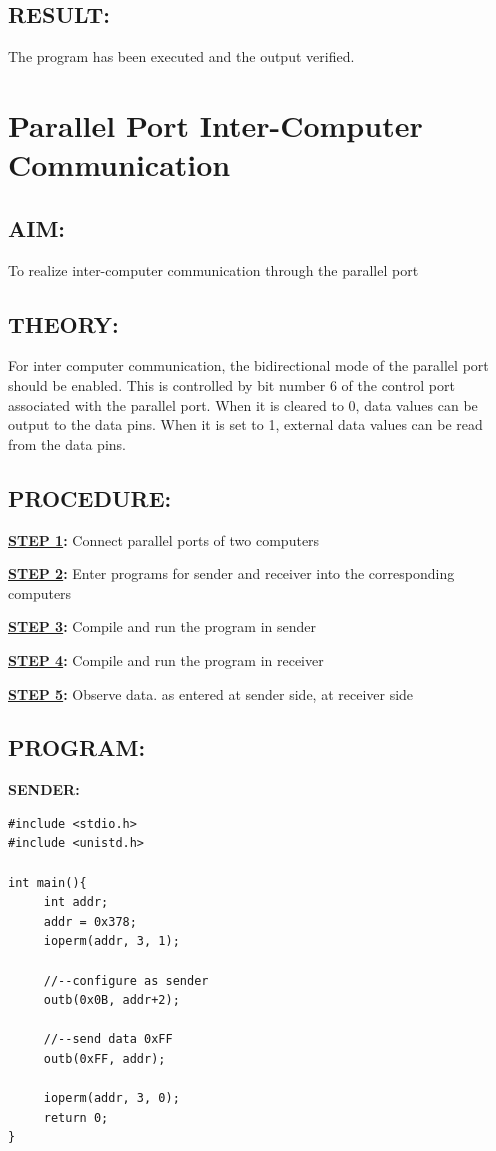 \documentclass[a4paper,28pt]{report}
\begin{document}
\section*{RESULT:}
The program has been executed and the output verified.
%
%
\chapter{Parallel Port Inter-Computer Communication}
%
%
%
%
\section*{AIM:}
To realize inter-computer communication through the parallel port
\section*{THEORY:}
For inter computer communication, the bidirectional mode of the parallel port should be enabled. This is controlled by bit number 6 of the control port associated with the parallel port. When it is cleared to 0, data values can be output to the data pins. When it is set to 1, external data values can be read from the data pins.
\section*{PROCEDURE:}
\textbf{\underline{STEP 1}:} Connect parallel ports of two computers

\textbf{\underline{STEP 2}:} Enter programs for sender and receiver into the corresponding\\\hspace*{55pt}computers

\textbf{\underline{STEP 3}:} Compile and run the program in sender

\textbf{\underline{STEP 4}:} Compile and run the program in receiver

\textbf{\underline{STEP 5}:} Observe data. as entered at sender side, at receiver side

\section*{PROGRAM:}
\textbf{SENDER:}
\begin{lstlisting}
#include <stdio.h>
#include <unistd.h>

int main(){
     int addr;
     addr = 0x378;
     ioperm(addr, 3, 1);
     
     //--configure as sender
     outb(0x0B, addr+2);
     
     //--send data 0xFF
     outb(0xFF, addr);
     
     ioperm(addr, 3, 0);
     return 0;
}
\end{lstlisting}
\end{document}
